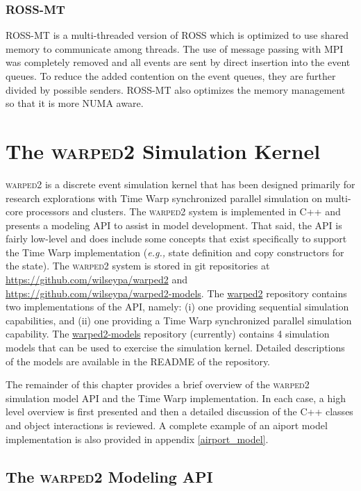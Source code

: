 \documentclass[11pt]{book}
\begin{document}
\subsection{ROSS-MT}

ROSS-MT \cite{jagtap-12} is a multi-threaded version of ROSS which is optimized to use shared memory
to communicate among threads.  The use of message passing with MPI was completely removed and all
events are sent by direct insertion into the event queues.  To reduce the added contention on the
event queues, they are further divided by possible senders.  ROSS-MT also optimizes the memory
management so that it is more NUMA aware.



\chapter[\textsc{warped2}]{The \textsc{warped2} Simulation Kernel}\label{warped2_overview}

\textsc{warped2} is a discrete event simulation kernel that has been designed primarily for research
explorations with Time Warp synchronized parallel simulation on multi-core processors and clusters.
The \textsc{warped2} system is implemented in C++ and presents a modeling API to assist in model
development.  That said, the API is fairly low-level and does include some concepts that exist
specifically to support the Time Warp implementation (\emph{e.g.,} state definition and copy
constructors for the state).  The \textsc{warped2} system is stored in git repositories at
\url{https://github.com/wilseypa/warped2} and \url{https://github.com/wilseypa/warped2-models}.  The
\url{warped2} repository contains two implementations of the API, namely: (i) one providing
sequential simulation capabilities, and (ii) one providing a Time Warp synchronized parallel
simulation capability.  The \url{warped2-models} repository (currently) contains 4 simulation models
that can be used to exercise the simulation kernel.  Detailed descriptions of the models are
available in the README of the repository.

The remainder of this chapter provides a brief overview of the \textsc{warped2} simulation model API
and the Time Warp implementation.  In each case, a high level overview is first presented and then a
detailed discussion of the C++ classes and object interactions is reviewed.  A complete example of
an aiport model implementation is also provided in appendix \ref{airport_model}.

\section{The \textsc{warped2} Modeling API}
\end{document}
